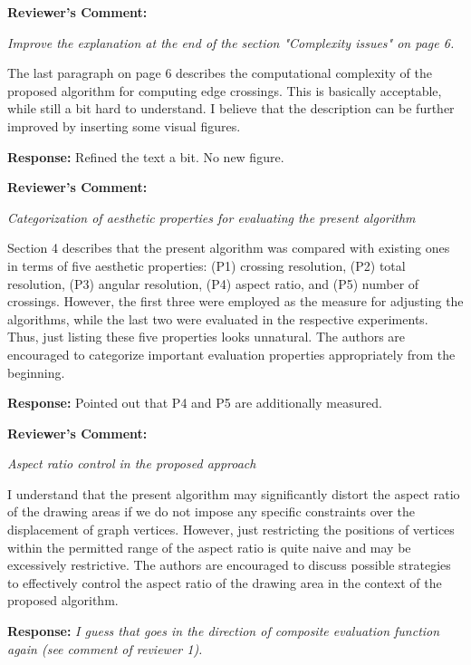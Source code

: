 \documentclass{article}
\newcommand{\rcomment}[1]{\vspace{0.3cm} \item \textbf{Reviewer's Comment:} {\em #1}}
\newcommand{\jcomment}[1]{\vspace{0.3cm} {\color{blue} \item \textbf{Reviewer's Comment:} {\em #1}}}
\newcommand{\response}{\vspace{0.2cm} \textbf{Response: }}
\newcommand{\jresponse}[1]{\vspace{0.2cm} \textbf{Response: }{\color{blue} {\em #1}}}
\begin{document}
\begin{itemize}

\rcomment{Improve the explanation at the end of the section "Complexity issues" on page 6.

The last paragraph on page 6 describes the computational complexity of the proposed algorithm for computing edge crossings. This is basically acceptable, while still a bit hard to understand. I believe that the description can be further improved by inserting some visual figures.}

\response{Refined the text a bit. No new figure.}

\rcomment{Categorization of aesthetic properties for evaluating the present algorithm

Section 4 describes that the present algorithm was compared with existing ones in terms of five aesthetic properties: (P1) crossing resolution, (P2) total resolution, (P3) angular resolution, (P4) aspect ratio, and (P5) number of crossings. However, the first three were employed as the measure for adjusting the algorithms, while the last two were evaluated in the respective experiments. Thus, just listing these five properties looks unnatural. The authors are encouraged to categorize important evaluation properties appropriately from the beginning.}

\response{Pointed out that P4 and P5 are additionally measured.}

\jcomment{Aspect ratio control in the proposed approach

I understand that the present algorithm may significantly distort the aspect ratio of the drawing areas if we do not impose any specific constraints over the displacement of graph vertices. However, just restricting the positions of vertices within the permitted range of the aspect ratio is quite naive and may be excessively restrictive. The authors are encouraged to discuss possible strategies to effectively control the aspect ratio of the drawing area in the context of the proposed algorithm.}

\jresponse{I guess that goes in the direction of composite evaluation function again (see comment of reviewer 1).}

\end{itemize}
\end{document}
